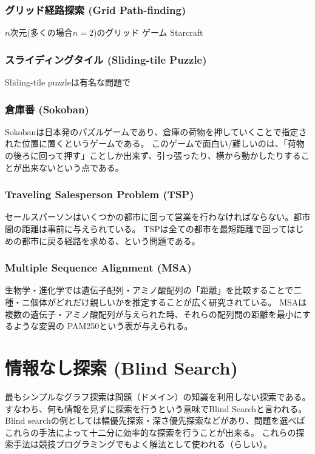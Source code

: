 \documentclass{book}
\begin{document}
\subsection{グリッド経路探索 (Grid Path-finding)}
$n$次元(多くの場合$n=2$)のグリッド
ゲーム
Starcraft


\subsection{スライディングタイル (Sliding-tile Puzzle)}

Sliding-tile puzzleは有名な問題で


\subsection{倉庫番 (Sokoban)}
Sokobanは日本発のパズルゲームであり、倉庫の荷物を押していくことで指定された位置に置くというゲームである。
このゲームで面白い/難しいのは、「荷物の後ろに回って押す」ことしか出来ず、引っ張ったり、横から動かしたりすることが出来ないという点である。

\subsection{Traveling Salesperson Problem (TSP)}

セールスパーソンはいくつかの都市に回って営業を行わなければならない。都市間の距離は事前に与えられている。
TSPは全ての都市を最短距離で回ってはじめの都市に戻る経路を求める、という問題である。

\subsection{Multiple Sequence Alignment (MSA)}

生物学・進化学では遺伝子配列・アミノ酸配列の「距離」を比較することで二種・ニ個体がどれだけ親しいかを推定することが広く研究されている。
MSAは複数の遺伝子・アミノ酸配列が与えられた時、それらの配列間の距離を最小にするような変異の
PAM250という表が与えられる。




\chapter{情報なし探索 (Blind Search)}
\label{ch:blind-search}
最もシンプルなグラフ探索は問題（ドメイン）の知識を利用しない探索である。
すなわち、何も情報を見ずに探索を行うという意味でBlind Searchと言われる。
Blind searchの例としては幅優先探索・深さ優先探索などがあり、問題を選べばこれらの手法によって十二分に効率的な探索を行うことが出来る。
これらの探索手法は競技プログラミングでもよく解法として使われる（らしい）。
\end{document}
